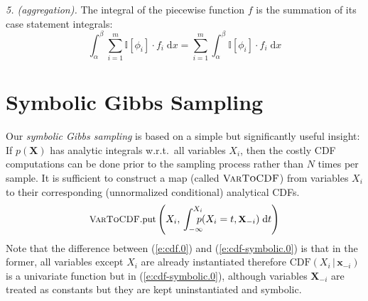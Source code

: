 \documentclass[]{article}
\newcommand{\bvec}[1]{\textbf{#1}}
\newcommand{\indicator}{\mathbb{I}}%
\newcommand{\pr}{p}
\newcommand{\dd}{\;\mathrm{d}} %
\begin{document}
\emph{5. (aggregation).}
The integral of the piecewise function $f$ is the summation of its case statement integrals:
\begin{equation*}
\int_\alpha^\beta \sum_{i=1}^m \indicator[\phi_i]\cdot f_i \dd x = 
\sum_{i=1}^m \int_\alpha^\beta \indicator[\phi_i] \cdot f_i \dd x
\end{equation*}


\section{Symbolic Gibbs Sampling}
\label{sect:symbolic.gibbs}

%
Our \emph{symbolic Gibbs sampling} is based on a simple but significantly useful insight:
If $\pr(\bvec{X})$
has analytic integrals w.r.t.\ all variables $X_i$,
then the costly CDF computations can be done prior to the sampling process rather than $N$ times per sample. 
It is sufficient to construct a map (called $\textsc{VarToCDF}$) from variables $X_i$ to their corresponding (unnormalized conditional) analytical CDFs. 
\begin{equation} \footnotesize
\label{e:cdf-symbolic.0}	
\textsc{VarToCDF}\text{.put}
\left(
X_i, \, %
\int_{-\infty}^{X_i} \!\!\!\!\! \pr(X_i = t , \bvec{X}_{-i}) \dd  t
\right)
\end{equation} 
Note that the difference between (\ref{e:cdf.0}) and (\ref{e:cdf-symbolic.0}) is that in the former, 
all variables except $X_i$ are already instantiated therefore 
$\text{CDF}(X_i  \,|\, \bvec{x}_{-i})$ is a univariate function but in  (\ref{e:cdf-symbolic.0}), 
although variables $\bvec{X}_{-i}$ are treated as constants but they are kept uninstantiated and symbolic.
\end{document}
